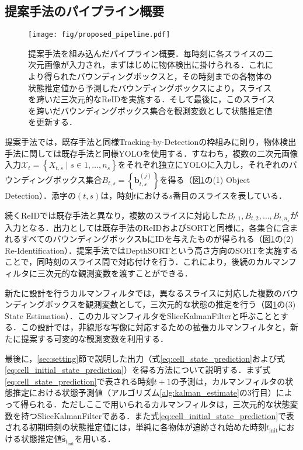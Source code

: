     \subsection{提案手法のパイプライン概要}
    \label{subsec:proposed_pipeline}

    \begin{figure}[t]
        \centering
        \texttt{[image: fig/proposed\_pipeline.pdf]}
        \caption[提案手法を組み込んだパイプライン概要]{提案手法を組み込んだパイプライン概要．毎時刻に各スライスの二次元画像が入力され，まずはじめに物体検出に掛けられる．これにより得られたバウンディングボックスと，その時刻までの各物体の状態推定値から予測したバウンディングボックスにより，スライスを跨いだ三次元的なReIDを実施する．そして最後に，このスライスを跨いだバウンディングボックス集合を観測変数として状態推定値を更新する．}
        \label{fig:proposed_pipeline}
    \end{figure}

    提案手法では，既存手法と同様Tracking-by-Detectionの枠組みに則り，物体検出手法に関しては既存手法と同様YOLOを使用する．すなわち，複数の二次元画像入力$\mathcal{X}_t = \left\{X_{t, s} \mid s \in {1, \dots, n_s}\right\}$をそれぞれ独立にYOLOに入力し，それぞれのバウンディングボックス集合$B_{t,s} = \left\{\bm{b}_{t,s}^{(j)}\right\}$を得る（図\ref{fig:proposed_pipeline}の(1) Object Detection）．添字の$(t,s)$は，時刻$t$における$s$番目のスライスを表している．

    続くReIDでは既存手法と異なり，複数のスライスに対応した$B_{t,1}, B_{t,2}, \dots, B_{t,n_s}$が入力となる．出力としては既存手法のReIDおよびSORTと同様に，各集合に含まれるすべてのバウンディングボックス$\bm{b}$にIDを与えたものが得られる（図\ref{fig:proposed_pipeline}の(2) Re-Identification）．提案手法ではDepthSORTという高さ方向のSORTを実施することで，同時刻のスライス間で対応付けを行う．これにより，後続のカルマンフィルタに三次元的な観測変数を渡すことができる．

    新たに設計を行うカルマンフィルタでは，異なるスライスに対応した複数のバウンディングボックスを観測変数として，三次元的な状態の推定を行う（図\ref{fig:proposed_pipeline}の(3) State Estimation）．このカルマンフィルタをSliceKalmanFilterと呼ぶこととする．この設計では，非線形な写像に対応するための拡張カルマンフィルタと，新たに提案する可変的な観測変数を利用する．

    最後に，\ref{sec:setting}節で説明した出力（式\ref{eq:cell_state_prediction}および式\ref{eq:cell_initial_state_prediction}）を得る方法について説明する．まず式\ref{eq:cell_state_prediction}で表される時刻$t+1$の予測は，カルマンフィルタの状態推定における状態予測値（アルゴリズム\ref{alg:kalman_estimate}の3行目）によって得られる．ただしここで用いられるカルマンフィルタは，三次元的な状態変数を持つSliceKalmanFilterである．また式\ref{eq:cell_initial_state_prediction}で表される初期時刻の状態推定値には，単純に各物体が追跡され始めた時刻$t_{\text{init}}$における状態推定値$\hat{\bm{s}}_{t_{\text{init}}}$を用いる．


